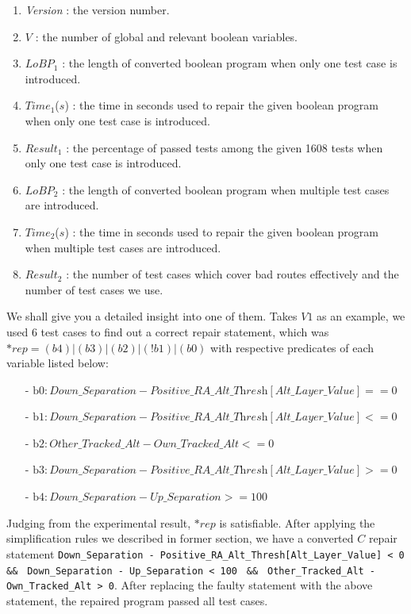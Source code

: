 \begin{enumerate}
\item {\it Version}   : the version number.
\item $V$             : the number of global and relevant boolean variables.
\item $LoBP_{1}$      : the length of converted boolean program when only one test case is introduced.
\item $Time_{1}$($s$) : the time in seconds used to repair the given boolean program when only one test case is introduced.
\item $Result_{1}$    : the percentage of passed tests among the given 1608 tests when only one test case is introduced.
\item $LoBP_{2}$      : the length of converted boolean program when multiple test cases are introduced.
\item $Time_{2}$($s$) : the time in seconds used to repair the given boolean program when multiple test cases are introduced.
\item $Result_{2}$    : the number of test cases which cover bad routes effectively and the number of test cases we use.
\end{enumerate}

We shall give you a detailed insight into one of them. Takes $V1$ as an example, we used 6 test cases to find out a correct repair statement, which was $*rep=(b4)|(b3)|(b2)|(!b1)|(b0)$ with respective predicates of each variable listed below:

\begin{itemize}
\item[-] $\text{b0} : \textit{Down\_Separation} - \textit{Positive\_RA\_Alt\_Thresh}[\textit{Alt\_Layer\_Value}] == 0$
\item[-] $\text{b1} : \textit{Down\_Separation} - \textit{Positive\_RA\_Alt\_Thresh}[\textit{Alt\_Layer\_Value}] <= 0$
\item[-] $\text{b2} : \textit{Other\_Tracked\_Alt} - \textit{Own\_Tracked\_Alt} <= 0$
\item[-] $\text{b3} : \textit{Down\_Separation} - \textit{Positive\_RA\_Alt\_Thresh}[\textit{Alt\_Layer\_Value}] >= 0$
\item[-] $\text{b4} : \textit{Down\_Separation} - \textit{Up\_Separation} >= 100$
\end{itemize}

Judging from the experimental result, $*rep$ is satisfiable. After applying the simplification rules we described in former section, we have a converted $C$ repair statement \lstinline|Down_Separation - Positive_RA_Alt_Thresh[Alt_Layer_Value] < 0| \lstinline| && | \lstinline|Down_Separation - Up_Separation < 100| \lstinline| && | \lstinline|Other_Tracked_Alt - Own_Tracked_Alt > 0|. After replacing the faulty statement with the above statement, the repaired program passed all test cases.

